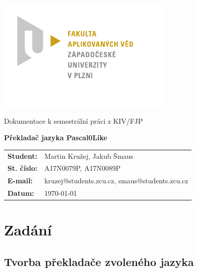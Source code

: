 \documentclass[
12pt,
a4paper,
pdftex,
czech,
titlepage
]{report}
\begin{document}
\begin{titlepage}
	\vspace*{-2cm}
	{\centering\includegraphics[scale=1.5]{FAV_logo.pdf}\par}
	\centering
	\vspace*{2cm}
	{\Large Dokumentace k semestrální práci z KIV/FJP\par}
	\vspace{1.0cm}
	{\Huge\bfseries Překladač jazyka Pascal0Like\par}
	\vspace{7cm}

	\begin{flushleft} 
	\begin{table}[ht]
	\label{stats}
	\begin{tabular}{ll}
	\textbf{Student:}  & Martin Kružej, Jakub Šmaus   \\
	\textbf{St. číslo:}   & A17N0079P, A17N0089P    \\
	\textbf{E-mail:}  & kruzej@students.zcu.cz, smaus@students.zcu.cz  \\
	\textbf{Datum:}    & \today            \\ 
	\end{tabular}
	\end{table}
	\end{flushleft}
	
	\vfill


\end{titlepage}

\tableofcontents
\thispagestyle{empty}
\clearpage

\chapter{Zadání}
\setcounter{page}{1}

\section{Tvorba překladače zvoleného jazyka}
\end{document}
